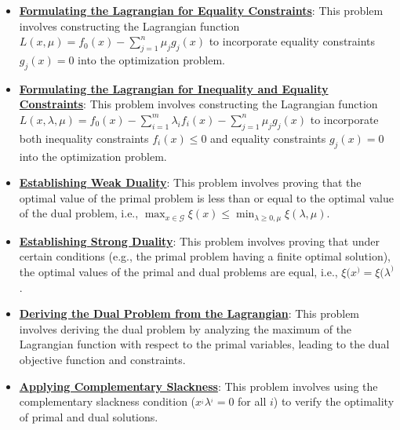 \documentclass{article}%
\begin{document}
\begin{itemize}[leftmargin=*]%
\item \href{https://www.math.purdue.edu/~yipn/421/2024-09-17-DualityGeneral.pdf#page=2}{\textbf{Formulating the Lagrangian for Equality Constraints}}: This problem involves constructing the Lagrangian function $L(x, \mu) = f_0(x) - \sum_{j=1}^n \mu_j g_j(x)$ to incorporate equality constraints $g_j(x) = 0$ into the optimization problem.%
\item \href{https://www.math.purdue.edu/~yipn/421/2024-09-17-DualityGeneral.pdf#page=7}{\textbf{Formulating the Lagrangian for Inequality and Equality Constraints}}: This problem involves constructing the Lagrangian function $L(x, \lambda, \mu) = f_0(x) - \sum_{i=1}^m \lambda_i f_i(x) - \sum_{j=1}^n \mu_j g_j(x)$ to incorporate both inequality constraints $f_i(x) \le 0$ and equality constraints $g_j(x) = 0$ into the optimization problem.%
\item \href{https://www.math.purdue.edu/~yipn/421/2024-09-17-DualityGeneral.pdf#page=5}{\textbf{Establishing Weak Duality}}: This problem involves proving that the optimal value of the primal problem is less than or equal to the optimal value of the dual problem, i.e., $\max_{x \in \mathcal{G}} \xi(x) \le \min_{\lambda \ge 0, \mu} \xi(\lambda, \mu)$.%
\item \href{https://www.math.purdue.edu/~yipn/421/2024-09-17-DualityGeneral.pdf#page=17}{\textbf{Establishing Strong Duality}}: This problem involves proving that under certain conditions (e.g., the primal problem having a finite optimal solution), the optimal values of the primal and dual problems are equal, i.e., $\xi(x^) = \xi(\lambda^)$.%
\item \href{https://www.math.purdue.edu/~yipn/421/2024-09-17-DualityGeneral.pdf#page=15}{\textbf{Deriving the Dual Problem from the Lagrangian}}: This problem involves deriving the dual problem by analyzing the maximum of the Lagrangian function with respect to the primal variables, leading to the dual objective function and constraints.%
\item \href{https://www.math.purdue.edu/~yipn/421/2024-09-17-DualityGeneral.pdf#page=22}{\textbf{Applying Complementary Slackness}}: This problem involves using the complementary slackness condition ($x^_i \lambda^_i = 0$ for all $i$) to verify the optimality of primal and dual solutions.%
\end{itemize}%
\end{document}
